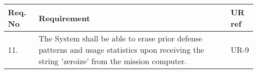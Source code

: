 \begin{center}
    \begin{tabular}{ | l | p{9cm} | l | }
    \hline
    Req. No & Requirement  & UR ref \\ \hline
    11. & The System shall be able to erase prior defense patterns and usage statistics upon receiving the string 'zeroize' from the mission computer.& UR-9\\ \hline
    \end{tabular}
\end{center}
